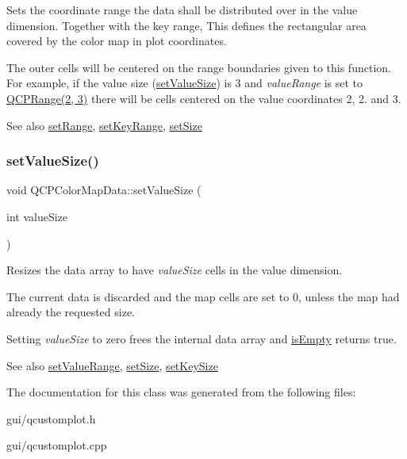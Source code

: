 Sets the coordinate range the data shall be distributed over in the value dimension. Together with the key range, This defines the rectangular area covered by the color map in plot coordinates.

The outer cells will be centered on the range boundaries given to this function. For example, if the value size (\hyperlink{classQCPColorMapData_a0893c9e3914513048b45e3429ffd16f2}{set\+Value\+Size}) is 3 and {\itshape value\+Range} is set to {\ttfamily \hyperlink{classQCPRange}{Q\+C\+P\+Range(2, 3)}} there will be cells centered on the value coordinates 2, 2. and 3.

\begin{DoxySeeAlso}{See also}
\hyperlink{classQCPColorMapData_aad9c1c7c703c1339489fc730517c83d4}{set\+Range}, \hyperlink{classQCPColorMapData_a0738c485f3c9df9ea1241b7a8bb6a86e}{set\+Key\+Range}, \hyperlink{classQCPColorMapData_a0d9ff35c299d0478b682bfbcdd9c097e}{set\+Size} 
\end{DoxySeeAlso}
\mbox{\label{classQCPColorMapData_a0893c9e3914513048b45e3429ffd16f2}} 
\subsubsection{\texorpdfstring{set\+Value\+Size()}{setValueSize()}}
{\footnotesize\ttfamily void Q\+C\+P\+Color\+Map\+Data\+::set\+Value\+Size (\begin{DoxyParamCaption}\item[{int}]{value\+Size }\end{DoxyParamCaption})}

Resizes the data array to have {\itshape value\+Size} cells in the value dimension.

The current data is discarded and the map cells are set to 0, unless the map had already the requested size.

Setting {\itshape value\+Size} to zero frees the internal data array and \hyperlink{classQCPColorMapData_aea88cc75a76ca571acf29b2ba8ac970d}{is\+Empty} returns true.

\begin{DoxySeeAlso}{See also}
\hyperlink{classQCPColorMapData_ada1b2680ba96a5f4175b6d341cf75d23}{set\+Value\+Range}, \hyperlink{classQCPColorMapData_a0d9ff35c299d0478b682bfbcdd9c097e}{set\+Size}, \hyperlink{classQCPColorMapData_ac7ef70e383aface34b44dbde49234b6b}{set\+Key\+Size} 
\end{DoxySeeAlso}


The documentation for this class was generated from the following files\+:\begin{DoxyCompactItemize}
\item 
gui/qcustomplot.\+h\item 
gui/qcustomplot.\+cpp\end{DoxyCompactItemize}
